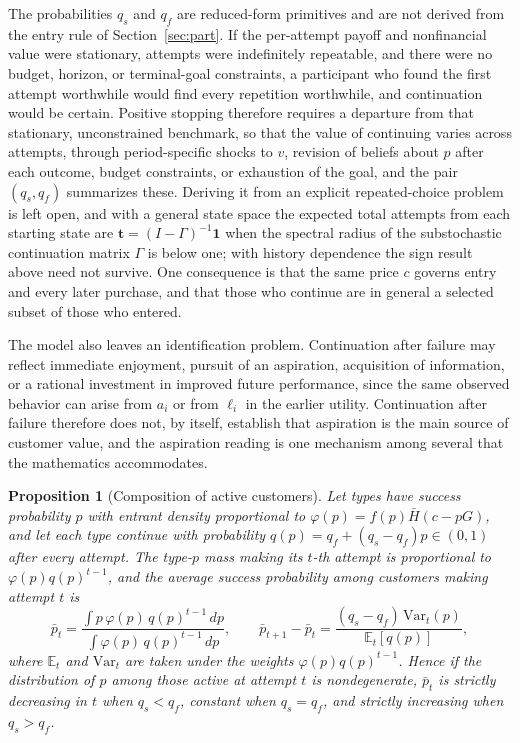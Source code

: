 \documentclass[11pt]{article}
\newtheorem{proposition}{Proposition}
\theoremstyle{remark}
\newcommand{\E}{\mathbb{E}}
\newcommand{\Hbar}{\bar H}
\begin{document}
The probabilities $q_s$ and $q_f$ are reduced-form primitives and are not derived from the entry rule of Section~\ref{sec:part}. If the per-attempt payoff and nonfinancial value were stationary, attempts were indefinitely repeatable, and there were no budget, horizon, or terminal-goal constraints, a participant who found the first attempt worthwhile would find every repetition worthwhile, and continuation would be certain. Positive stopping therefore requires a departure from that stationary, unconstrained benchmark, so that the value of continuing varies across attempts, through period-specific shocks to $v$, revision of beliefs about $p$ after each outcome, budget constraints, or exhaustion of the goal, and the pair $(q_s,q_f)$ summarizes these. Deriving it from an explicit repeated-choice problem is left open, and with a general state space the expected total attempts from each starting state are $\mathbf t=(I-\Gamma)^{-1}\mathbf 1$ when the spectral radius of the substochastic continuation matrix $\Gamma$ is below one; with history dependence the sign result above need not survive. One consequence is that the same price $c$ governs entry and every later purchase, and that those who continue are in general a selected subset of those who entered.

The model also leaves an identification problem. Continuation after failure may reflect immediate enjoyment, pursuit of an aspiration, acquisition of information, or a rational investment in improved future performance, since the same observed behavior can arise from $a_i$ or from $\ell_i$ in the earlier utility. Continuation after failure therefore does not, by itself, establish that aspiration is the main source of customer value, and the aspiration reading is one mechanism among several that the mathematics accommodates.

\begin{proposition}[Composition of active customers]\label{prop:persist}
Let types have success probability $p$ with entrant density proportional to $\varphi(p)=f(p)\Hbar(c-pG)$, and let each type continue with probability $q(p)=q_f+(q_s-q_f)p\in(0,1)$ after every attempt. The type-$p$ mass making its $t$-th attempt is proportional to $\varphi(p)q(p)^{t-1}$, and the average success probability among customers making attempt $t$ is
\[
\bar p_t=\frac{\int p\,\varphi(p)\,q(p)^{t-1}\,dp}{\int \varphi(p)\,q(p)^{t-1}\,dp},
\qquad
\bar p_{t+1}-\bar p_t=\frac{(q_s-q_f)\,\mathrm{Var}_t(p)}{\E_t[q(p)]},
\]
where $\E_t$ and $\mathrm{Var}_t$ are taken under the weights $\varphi(p)q(p)^{t-1}$. Hence if the distribution of $p$ among those active at attempt $t$ is nondegenerate, $\bar p_t$ is strictly decreasing in $t$ when $q_s<q_f$, constant when $q_s=q_f$, and strictly increasing when $q_s>q_f$.
\end{proposition}
\end{document}
